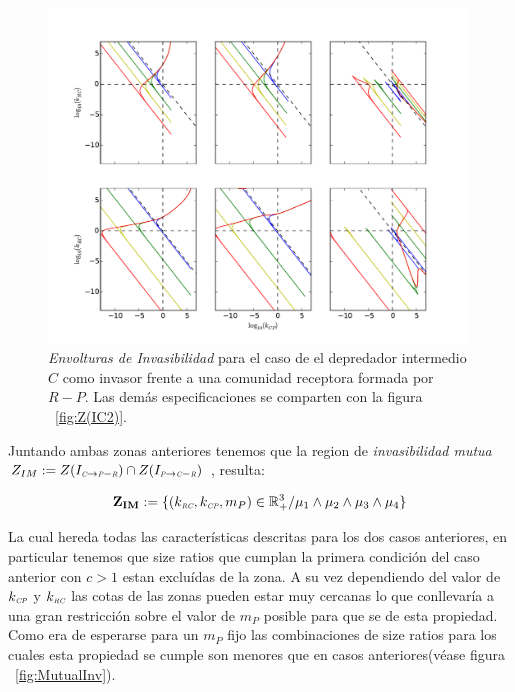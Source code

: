 \begin{figure}
  \centering
  \includegraphics[width = 0.99\textwidth]{./Plots/Z(IC5)AcGrGr.pdf}
  \caption[Env $Z(IC5)$]{\emph{Envolturas de Invasibilidad} para el caso de el depredador intermedio $C$ como invasor frente a una comunidad receptora formada por $R-P$. Las dem\'as especificaciones se comparten con la figura ~\ref{fig:Z(IC2)}.}
  \label{fig:Z(IC5)}
\end{figure}


Juntando ambas zonas anteriores tenemos que la region de \emph{invasibilidad mutua} $Z_{IM} := Z(I_{\textit{\tiny C} \to \textit{\tiny P}-\textit{\tiny R}}) \cap Z(I_{\textit{\tiny P} \to \textit{\tiny C}-\textit{\tiny R}})$ , resulta:

\begin{equation}
\mathbf{Z_{IM}} := \{ (k_{\textit{\tiny RC}},k_{\textit{\tiny CP}},m_P) \in \mathbb{R}^3_+ / \mu_1 \land \mu_2 \land \mu_3 \land \mu_4 \}
\end{equation}

La cual hereda todas las caracter\'isticas descritas para los dos casos anteriores, en particular tenemos que size ratios que cumplan la primera condici\'on del caso anterior con $c > 1$ estan exclu\'idas de la zona. A su vez dependiendo del valor de $k_{\textit{\tiny CP}}$ y $k_{\textit{\tiny RC}}$ las cotas de las zonas pueden estar muy cercanas lo que conllevar\'ia a una gran restricci\'on sobre el valor de $m_P$ posible para que se de esta propiedad. Como era de esperarse para un $m_P$ fijo las combinaciones de size ratios para los cuales esta propiedad se cumple son menores que en casos anteriores(v\'ease figura ~\ref{fig:MutualInv}).


